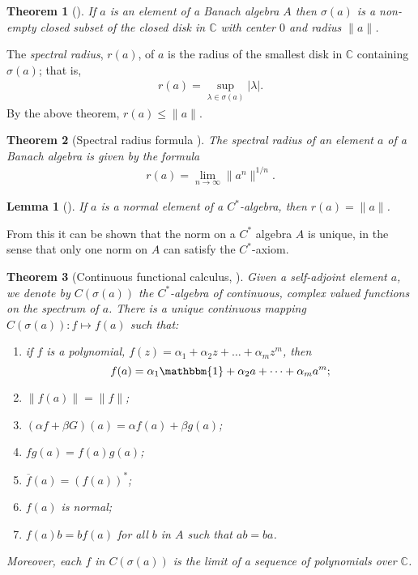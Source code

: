 \documentclass[12pt,a4paper]{report}
\theoremstyle{plain}
\newtheorem*{thm*}{Theorem}
\newtheorem{lemma}{Lemma}
\theoremstyle{definition}
\newcommand{\1}{\mathbbm{1}}
\newcommand{\C}{\mathbb{C}}
\newcommand{\spec}[1]{\sigma(#1)}
\begin{document}
\begin{thm*}[{\cite[3.2.3]{kadison83}}]
	If $a$ is an element of a Banach algebra $A$ then $\spec a$ is a non-empty closed subset of the
	closed disk in $\C$ with center $0$ and radius $\|a\|$.
\end{thm*}

The \emph{spectral radius}, $r(a)$, of $a$ is the radius of the smallest disk in $\C$ containing 
$\spec a$; that is, 
\begin{align*}
	r(a)=\sup_{\lambda\in\spec a}{|\lambda|}.
\end{align*}
By the above theorem, $r(a)\leq\|a\|$. 

\begin{thm*}[Spectral radius formula {\cite[3.3.3]{kadison83}}]
	The spectral radius of an element $a$ of a Banach algebra is given by the formula
	\begin{align*}
		r(a)= \lim_{n\to\infty} \|a^n\|^{1/n}.
	\end{align*}
\end{thm*}

\begin{lemma}[{\cite[4.1.1(i)]{kadison83}}]\label{lemma:411}
	If $a$ is a normal element of a $C^\ast$-algebra, then $r(a)=\|a\|$.
\end{lemma}

From this it can be shown that the norm on a $C^\ast$ algebra $A$ is unique, in the sense that only one norm on $A$ can satisfy the $C^\ast$-axiom. \cite[II.1.6.5]{blackadar06}



\begin{thm*}[Continuous functional calculus, {\cite[4.1.3]{kadison83}}]
	Given a self-adjoint element $a$, we denote by $C(\spec a)$ the $C^\ast$-algebra of continuous, 
	complex valued functions on the spectrum of $a$. There is a unique continuous mapping $C(\spec a):f
	\mapsto f(a)$ such that:
	\begin{enumerate}
		\item	if $f$ is a polynomial, $f(z)=\alpha_1+\alpha_2z+\dots+\alpha_mz^m$, then 
						\[f(a)=\alpha_1\1+\alpha_2a+\dots+\alpha_ma^m;\]
		\item	$\|f(a)\| = \|f\|$;
		\item	$(\alpha f+\beta G)(a) = \alpha f(a) + \beta g(a)$;
		\item	$fg(a)=f(a)g(a)$;
		\item	$\overline{f}(a) = (f(a))^\ast$;
		\item	$f(a)$ is normal;
		\item	$f(a)b=bf(a)$ for all $b$ in $A$ such that $ab=ba$.
	\end{enumerate}
	Moreover, each $f$ in $C(\spec a)$ is the limit of a sequence of polynomials over $\C$.
\end{thm*}
\end{document}
